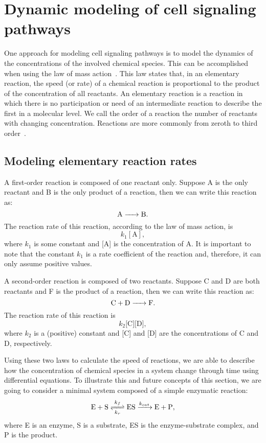\section{Dynamic modeling of cell signaling pathways}
One approach for modeling cell signaling pathways is to model the 
dynamics of the concentrations of the involved chemical species. This can be
accomplished when using the law of mass action~\cite{Voet2010}. This law 
states that, in an elementary reaction, the speed (or rate) of a 
chemical reaction is proportional to the product of the concentration of 
all reactants. An elementary reaction is a reaction in which there is no 
participation or need of an intermediate reaction to describe the first 
in a molecular level. We call the order of a reaction the number of
reactants with changing concentration. Reactions are more commonly from
zeroth to third order~\cite{steinfeld1999chemical}.

\subsection{Modeling elementary reaction rates}
A first-order reaction is composed of one reactant only. Suppose A is 
the only reactant and B is the only product of a reaction, then we can
write this reaction as:
\begin{equation}
\ce{
    A -> B
}.
\end{equation}
The reaction rate of this reaction, according to the law of mass 
action, is 
\begin{equation}
    k_1[\text{A}],
\end{equation}
where $k_1$ is some constant and [A] is the concentration of A. It is
important to note that the constant $k_1$ is a rate coefficient of the 
reaction and, therefore, it can only assume positive values.

A second-order reaction is composed of two reactants. Suppose C and D 
are both reactants and F is the product of a reaction, then we can write 
this reaction as:
\begin{equation}
\ce{
    C + D -> F
}.
\end{equation}
The reaction rate of this reaction is
\begin{equation}
    k_2\text{[C][D]},
\end{equation}
where $k_2$ is a (positive) constant and [C] and [D] are the 
concentrations of C and D, respectively.

Using these two laws to calculate the speed of reactions, we are able 
to describe how the concentration of chemical species in a system change 
through time using differential equations. To illustrate this and future 
concepts of this section, we are going to consider a minimal system 
composed of a simple enzymatic reaction:
\begin{equation}
\ce{
    E + S <=>[\ce{$k$_f}][\ce{$k$_r}] ES ->[\ce{$k_{cat}$}] E + P
},
\label{eq:simple_enzymatic}
\end{equation}
where E is an enzyme, S is a substrate, ES is the enzyme-substrate
complex, and P is the product.

